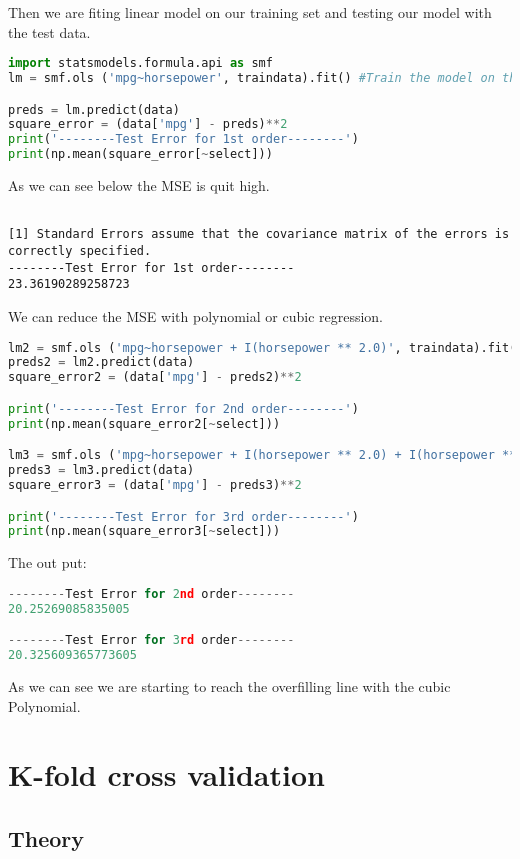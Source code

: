 Then we are fiting linear model on our  training set and testing our model with the test data.

\begin{lstlisting}[language=Python]
import statsmodels.formula.api as smf
lm = smf.ols ('mpg~horsepower', traindata).fit() #Train the model on the traindata.

preds = lm.predict(data)
square_error = (data['mpg'] - preds)**2
print('--------Test Error for 1st order--------')
print(np.mean(square_error[~select]))
\end{lstlisting}
As we can see below the MSE is quit high.
\begin{lstlisting}

[1] Standard Errors assume that the covariance matrix of the errors is correctly specified.
--------Test Error for 1st order--------
23.36190289258723
\end{lstlisting}
We can reduce the MSE with polynomial or cubic regression.
\begin{lstlisting}[language=Python]
lm2 = smf.ols ('mpg~horsepower + I(horsepower ** 2.0)', traindata).fit()
preds2 = lm2.predict(data)
square_error2 = (data['mpg'] - preds2)**2

print('--------Test Error for 2nd order--------')
print(np.mean(square_error2[~select]))

lm3 = smf.ols ('mpg~horsepower + I(horsepower ** 2.0) + I(horsepower ** 3.0)', traindata).fit()
preds3 = lm3.predict(data)
square_error3 = (data['mpg'] - preds3)**2

print('--------Test Error for 3rd order--------')
print(np.mean(square_error3[~select]))

\end{lstlisting}
The out put:
\begin{lstlisting}[language=Python]
--------Test Error for 2nd order--------
20.25269085835005

--------Test Error for 3rd order--------
20.325609365773605

\end{lstlisting}
As we can see we are starting to reach the overfilling line with the cubic Polynomial. 
 
\section {K-fold cross validation}
\subsection{Theory}

